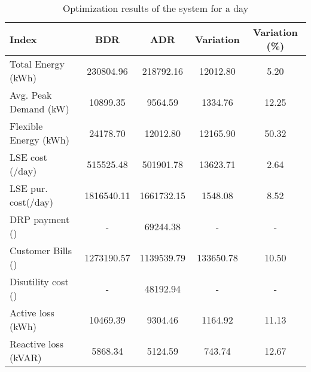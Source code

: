 \documentclass[journal]{IEEEtran}
\begin{document}
\begin{table}[!bt]
	\centering
	\renewcommand{\arraystretch}{1.3}
	\setlength\tabcolsep{1pt}
	\caption{Optimization results of the system for a day}
	\label{tab:Ch6_Optimization results 108}
	\begin{tabular}{lcccc}
		\hline
		Index                       & BDR         & ADR        & Variation & Variation (\%) \\ \hline
		Total   Energy (kWh)           & 230804.96             & 218792.16  & 12012.80              & 5.20                  \\
		Avg. Peak   Demand (kW)     & 10899.35              & 9564.59    & 1334.76               & 12.25                 \\
		Flexible   Energy (kWh)        & 24178.70              & 12012.80   & 12165.90              & 50.32                 \\
		LSE cost   (\rupee/day)            & 515525.48             & 501901.78  & 13623.71              & 2.64                  \\
		LSE pur. cost(\rupee/day) & 1816540.11            & 1661732.15 & 1548.08               & 8.52                  \\
		DRP payment   (\rupee)             & \multicolumn{1}{c}{-} & 69244.38   & \multicolumn{1}{c}{-} & \multicolumn{1}{c}{-} \\
		Customer  Bills (\rupee)           & 1273190.57            & 1139539.79 & 133650.78             & 10.50                 \\
		Disutility   cost (\rupee)         & \multicolumn{1}{c}{-} & 48192.94   & \multicolumn{1}{c}{-} & \multicolumn{1}{c}{-} \\
		Active   loss (kWh)       & 10469.39              & 9304.46    & 1164.92               & 11.13                 \\
		Reactive   loss (kVAR)   & 5868.34               & 5124.59    & 743.74                & 12.67       \\    \hline
	\end{tabular}
 \vspace{-1mm}
\end{table}
\end{document}
